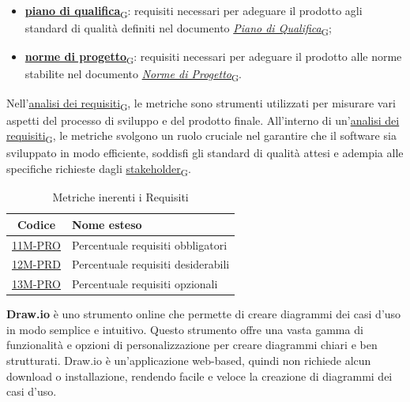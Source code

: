 \begin{enumerate}
\begin{itemize}
		      \item \href{https://7last.github.io/docs/rtb/documentazione-interna/glossario\#piano-di-qualifica}{\textbf{piano di qualifica}\textsubscript{G}}: requisiti necessari per adeguare il prodotto agli standard di qualità definiti nel documento \href{https://7last.github.io/docs/rtb/documentazione-interna/glossario\#piano-di-qualifica}{\textit{Piano di Qualifica}\textsubscript{G}};
		      \item \href{https://7last.github.io/docs/rtb/documentazione-interna/glossario\#norme-di-progetto}{\textbf{norme di progetto}\textsubscript{G}}: requisiti necessari per adeguare il prodotto alle norme stabilite nel documento \href{https://7last.github.io/docs/rtb/documentazione-interna/glossario\#norme-di-progetto}{\textit{Norme di Progetto}\textsubscript{G}}.
	      \end{itemize}
\end{enumerate}

Nell'\href{https://7last.github.io/docs/rtb/documentazione-interna/glossario\#analisi-dei-requisiti}{analisi dei requisiti\textsubscript{G}}, le metriche sono strumenti utilizzati per misurare vari aspetti del processo di sviluppo e del prodotto finale. All'interno di un'\href{https://7last.github.io/docs/rtb/documentazione-interna/glossario\#analisi-dei-requisiti}{analisi dei requisiti\textsubscript{G}}, le metriche svolgono un ruolo cruciale nel garantire che il software sia sviluppato in modo efficiente, soddisfi gli standard di qualità attesi e adempia alle specifiche richieste dagli \href{https://7last.github.io/docs/rtb/documentazione-interna/glossario\#stakeholder}{stakeholder\textsubscript{G}}.
\begin{table}[!h]
	\centering
	\begin{tabular}{ | c | l | }
		\hline
		\textbf{Codice}                      & \textbf{Nome esteso}               \\
		\hline
		\underline{\hyperlink{11M}{11M-PRO}} & Percentuale requisiti obbligatori  \\
		\underline{\hyperlink{12M}{12M-PRD}} & Percentuale requisiti desiderabili \\
		\underline{\hyperlink{13M}{13M-PRO}} & Percentuale requisiti opzionali    \\
		\hline
	\end{tabular}
	\caption{Metriche inerenti i Requisiti}
\end{table}

\textbf{Draw.io} è uno strumento online che permette di creare diagrammi dei casi d'uso in modo semplice e intuitivo. Questo strumento offre una vasta gamma di funzionalità e opzioni di personalizzazione per creare diagrammi chiari e ben strutturati. Draw.io è un'applicazione web-based, quindi non richiede alcun download o installazione, rendendo facile e veloce la creazione di diagrammi dei casi d'uso.

